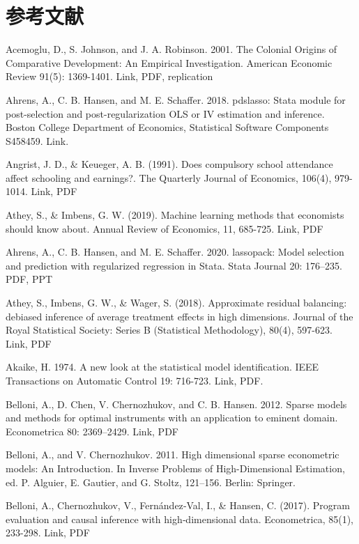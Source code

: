 {%

\section{参考文献}


Acemoglu, D., S. Johnson, and J. A. Robinson. 2001. The Colonial Origins of Comparative Development: An Empirical Investigation. American Economic Review 91(5): 1369-1401. Link,  PDF, replication

Ahrens, A., C. B. Hansen, and M. E. Schaffer. 2018. pdslasso: Stata module for post-selection and post-regularization
OLS or IV estimation and inference. Boston College Department of Economics, Statistical Software Components
S458459. Link.

Angrist, J. D., \& Keueger, A. B. (1991). Does compulsory school attendance affect schooling and earnings?. The Quarterly Journal of Economics, 106(4), 979-1014. Link, PDF

Athey, S., \& Imbens, G. W. (2019). Machine learning methods that economists should know about. Annual Review of Economics, 11, 685-725. Link, PDF

Ahrens, A., C. B. Hansen, and M. E. Schaffer. 2020. lassopack: Model selection and prediction with regularized regression in Stata. Stata Journal 20: 176–235. PDF, PPT

Athey, S., Imbens, G. W., \& Wager, S. (2018). Approximate residual balancing: debiased inference of average treatment effects in high dimensions. Journal of the Royal Statistical Society: Series B (Statistical Methodology), 80(4), 597-623. Link, PDF         

Akaike, H. 1974. A new look at the statistical model identification.  IEEE Transactions on Automatic Control 19: 716-723. Link, PDF.

Belloni, A., D. Chen, V. Chernozhukov, and C. B. Hansen. 2012. Sparse models and methods for optimal instruments
with an application to eminent domain. Econometrica 80: 2369–2429. Link, PDF %

Belloni, A., and V. Chernozhukov. 2011. High dimensional sparse econometric models: An Introduction. In Inverse
Problems of High-Dimensional Estimation, ed. P. Alguier, E. Gautier, and G. Stoltz, 121–156. Berlin: Springer.


Belloni, A., Chernozhukov, V., Fernández‐Val, I., \& Hansen, C. (2017). Program evaluation and causal inference with high‐dimensional data. Econometrica, 85(1), 233-298. Link, PDF

}
